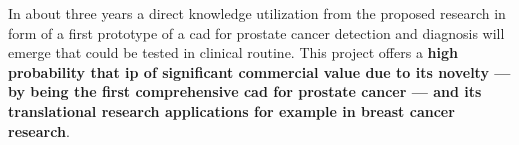 In about three years a direct knowledge utilization from the proposed research in form of a first prototype of a \ac{cad} for prostate cancer detection and diagnosis will emerge that could be tested in clinical routine.
This project offers a \textbf{high probability that \ac{ip} of significant commercial value due to its novelty --- by being the first comprehensive \ac{cad} for prostate cancer --- and its translational research applications for example in breast cancer research}.
